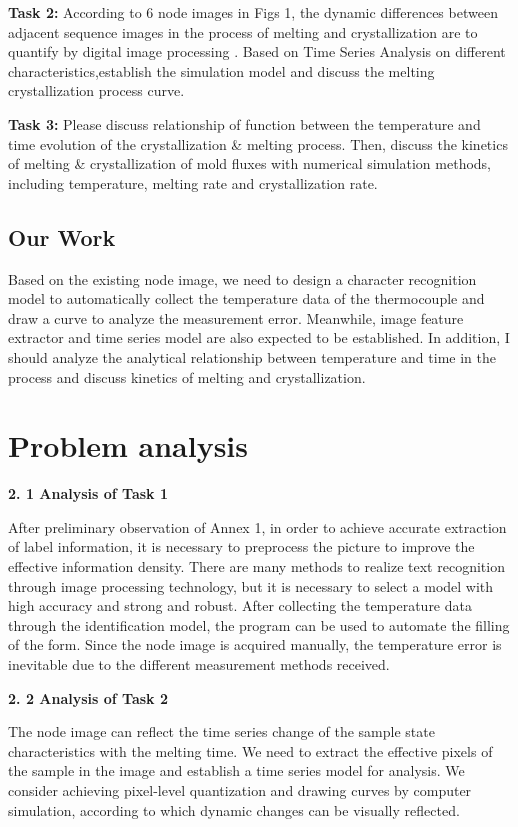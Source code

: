 \documentclass{apmcmthesis}
\begin{document}
\noindent\textbf{Task 2: } According to 6 node images in Figs 1, the dynamic differences between adjacent sequence images in the process of melting and crystallization are to quantify by digital image processing . Based on Time Series Analysis on different characteristics,establish the simulation model and discuss the melting crystallization process curve.
      	
\noindent\textbf{Task 3: } Please discuss relationship of function between the temperature and time evolution of the crystallization \& melting process. Then, discuss the kinetics of melting \& crystallization of mold fluxes with numerical simulation methods,  including temperature, melting rate and crystallization rate.

\subsection{Our Work}
	
	Based on the existing node image, we need to design a character recognition model to automatically collect the temperature data of the thermocouple and draw a curve to analyze the measurement error. Meanwhile, image feature extractor and time series model are also expected to be established. In addition, I should analyze the analytical relationship between temperature and time in the process and discuss kinetics of melting and crystallization.
	
\section{Problem analysis}

	\noindent\textbf{2. 1 Analysis of Task 1}
		
		After preliminary observation of Annex 1, in order to achieve accurate extraction of label information, it is necessary to preprocess the picture to improve the effective information density. There are many methods to realize text recognition through image processing technology, but it is necessary to select a model with high accuracy and strong and robust. After collecting the temperature data through the identification model, the program can be used to automate the filling of the form. Since the node image is acquired manually, the temperature error is inevitable due to the different measurement methods received.
		
	\noindent\textbf{2. 2 Analysis of Task 2}
	
    	The node image can reflect the time series change of the sample state characteristics with the melting time. We need to extract the effective pixels of the sample in the image and establish a time series model for analysis. We consider achieving pixel-level quantization and drawing curves by computer simulation, according to which dynamic changes can be visually reflected.
\end{document}
